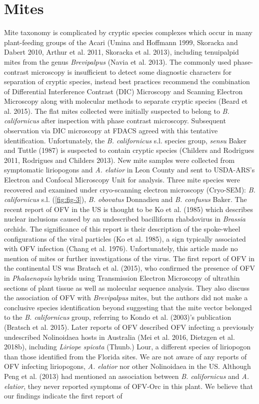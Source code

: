 \documentclass[12pt,final,CPage]{ufthesis}
\begin{document}
{{  \section{Mites}\label{mites}}

  Mite taxonomy is complicated by cryptic species complexes which occur in many plant-feeding groups of the Acari (Umina and Hoffmann 1999, Skoracka and Dabert 2010, Arthur et al. 2011, Skoracka et al. 2013), including tenuipalpid mites from the genus \emph{Brevipalpus} (Navia et al. 2013). The commonly used phase-contrast microscopy is insufficient to detect some diagnostic characters for separation of cryptic species, instead best practices recommend the combination of Differential Interference Contrast (DIC) Microscopy and Scanning Electron Microscopy along with molecular methods to separate cryptic species (Beard et al. 2015). The flat mites collected were initially suspected to belong to \emph{B. californicus} after inspection with phase contrast microscopy. Subsequent observation via DIC microscopy at FDACS agreed with this tentative identification. Unfortunately, the \emph{B. californicus} s.l. species group, \emph{sensu} Baker and Tuttle (1987) is suspected to contain cryptic species (Childers and Rodrigues 2011, Rodrigues and Childers 2013). New mite samples were collected from symptomatic liriopogons and \emph{A. elatior} in Leon County and sent to USDA-ARS's Electron and Confocal Microscopy Unit for analysis. Three mite species were recovered and examined under cryo-scanning electron microscopy (Cryo-SEM): \emph{B. californicus} s.l. (\ref{fig:fig-3}), \emph{B. obovatus} Donnadieu and \emph{B. confusus} Baker. The recent report of OFV in the US is thought to be Ko et al. (1985) which describes nuclear inclusions caused by an undescribed bacilliform rhabdovirus in \emph{Brassia} orchids. The significance of this report is their description of the spoke-wheel configurations of the viral particles (Ko et al. 1985), a sign typically associated with OFV infection (Chang et al. 1976). Unfortunately, this article made no mention of mites or further investigations of the virus. The first report of OFV in the continental US was Bratsch et al. (2015), who confirmed the presence of OFV in \emph{Phalaenopsis} hybrids using Transmission Electron Microscopy of ultrathin sections of plant tissue as well as molecular sequence analysis. They also discuss the association of OFV with \emph{Brevipalpus} mites, but the authors did not make a conclusive species identification beyond suggesting that the mite vector belonged to the \emph{B. californicus} group, referring to Kondo et al. (2003)'s publication (Bratsch et al. 2015). Later reports of OFV described OFV infecting a previously undescribed Nolinoidaea hosts in Australia (Mei et al. 2016, Dietzgen et al. 2018b), including \emph{Liriope spicata} (Thunb.) Lour, a different species of liriopogon than those identified from the Florida sites. We are not aware of any reports of OFV infecting liriopogons, \emph{A. elatior} nor other Nolinoidaea in the US. Although Peng et al. (2013) had mentioned an association between \emph{B. californicus} and \emph{A. elatior}, they never reported symptoms of OFV-Orc in this plant. We believe that our findings indicate the first report of }
\end{document}

